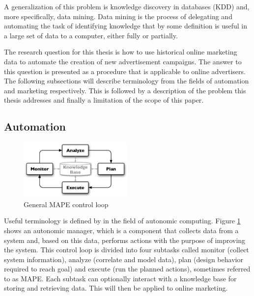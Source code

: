 \documentclass[10pt,twocolumn]{article}
\begin{document}
A generalization of this problem is knowledge discovery in databases (KDD) and, more specifically, data mining. Data mining is the process of delegating and automating the task of identifying knowledge that by some definition is useful in a large set of data to a computer, either fully or partially.

The research question for this thesis is how to use historical online marketing data to automate the creation of new advertisement campaigns. The answer to this question is presented as a procedure that is applicable to online advertisers. The following subsections will describe terminology from the fields of automation and marketing respectively. This is followed by a description of the problem this thesis addresses and finally a limitation of the scope of this paper.

\subsection{Automation}
\begin{figure}[htb] \centering \includegraphics[width=0.5\textwidth]{mape.eps}
	\caption{General MAPE control loop}
	\label{fig:MAPE}
\end{figure}

Useful terminology is defined by \citet{IBM2006} in the field of autonomic computing. Figure \ref{fig:MAPE} shows an autonomic manager, which is a component that collects data from a system and, based on this data, performs actions with the purpose of improving the system. This control loop is divided into four subtasks called monitor (collect system information), analyze (correlate and model data), plan (design behavior required to reach goal) and execute (run the planned actions), sometimes referred to as MAPE. Each subtask can optionally interact with a knowledge base for storing and retrieving data. This will then be applied to online marketing.
\end{document}
